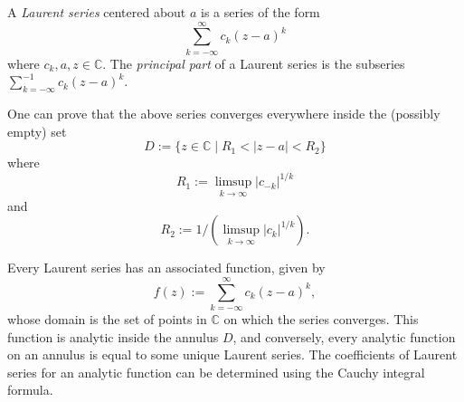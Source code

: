 \documentclass{article}
\begin{document}
A \emph{Laurent series} centered about $a$ is a series of the form
$$
\sum_{k=-\infty}^\infty c_k (z-a)^k
$$
where $c_k, a, z \in \mathbb{C}$. The \emph{principal part} of a Laurent series is the subseries $\sum_{k=-\infty}^{-1} c_k (z-a)^k$.

One can prove that the above series converges everywhere inside the (possibly empty) set
$$
D := \{z \in \mathbb{C} \mid R_1 < |z-a| < R_2 \}
$$
where
$$
R_1 := \limsup_{k \rightarrow\infty} |c_{-k}|^{1/k}
$$
and
$$
R_2 := 1/\left(\limsup_{k \rightarrow\infty} |c_{k}|^{1/k}\right).
$$

Every Laurent series has an associated function, given by
$$
f(z) := \sum_{k=-\infty}^\infty c_k (z-a)^k,
$$
whose domain is the set of points in $\mathbb{C}$ on which the series converges. This function is analytic inside the annulus $D$, and conversely, every analytic function on an annulus is equal to some unique Laurent series. The coefficients of Laurent series for an analytic function can be determined using the Cauchy integral formula.
\end{document}
